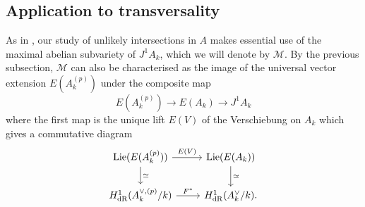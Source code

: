 \documentclass[11pt]{amsart}
\newcommand{\dR}{\mathrm{dR}}
\newcommand{\tors}{\mathrm{tors}}
\newcommand{\Lie}{\mathrm{Lie}}
\newcommand{\End}{\mathrm{End}}
\theoremstyle{plain}
\newtheorem{lemma}{Lemma}
\theoremstyle{definition}
\newcommand{\F}{\mathbb{F}}
\newcommand{\netan}[1]{{\color{blue} \sf $\clubsuit\clubsuit\clubsuit$ Netan: [#1]}}
\begin{document}
\subsection{Application to transversality}
As in \cite{buium:96}, our study of unlikely intersections in $A$ makes essential use of the maximal abelian subvariety of $J^1 A_k$, which we will denote by $\mathcal{M}$. By the previous subsection, $\mathcal{M}$ can also be characterised as the image of the universal vector extension $E(A_k ^{(p)})$ under the composite map
\[
E(A_k ^{(p)})\to E(A_k )\to J^1 A_k
\]
where the first map is the unique lift $E(V)$ of the Verschiebung on $A_k$ which gives a commutative diagram
\[
\begin{tikzcd}
\Lie (E(A_k ^{(p)})) \arrow[d, "\simeq "] \arrow[r, "E(V)"] & \Lie (E(A_k )) \arrow[d, "\simeq "] \\
H^1 _{\dR}(A_k ^{\vee ,(p)} /k) \arrow[r, "F^*"]                & H^1 _{\dR}(A_k ^\vee /k).               
\end{tikzcd}
\]
\end{document}
